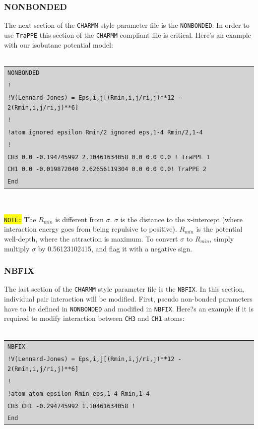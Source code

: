\subsubsection{NONBONDED}
The next section of the \texttt{CHARMM} style parameter file is the \texttt{NONBONDED}. In order to use \texttt{TraPPE} this section of the \texttt{CHARMM} compliant file is critical. Here's an example with our isobutane potential model:\\\\
\colorbox{lightgray}{
\begin{tabular}{l}
\texttt{NONBONDED }\\
\texttt{!}\\
\texttt{!V(Lennard-Jones) = Eps,i,j[(Rmin,i,j/ri,j)**12 - 2(Rmin,i,j/ri,j)**6]}\\
\texttt{!}\\
\texttt{!atom  ignored   epsilon     Rmin/2       ignored  eps,1-4  Rmin/2,1-4}\\
\texttt{!}\\
\texttt{CH3    0.0      -0.194745992  2.10461634058 0.0   0.0   0.0 ! TraPPE 1}\\
\texttt{CH1    0.0      -0.019872040  2.62656119304 0.0   0.0   0.0! TraPPE 2}\\
\texttt{End}\\
\end{tabular}}\\\\
\colorbox{yellow}{\texttt{NOTE:}} The \texttt{$R_{min}$} is different from \texttt{$\sigma$}. \texttt{$\sigma$} is the distance to the x-intercept (where interaction energy goes from being repulsive to positive). \texttt{$R_{min}$} is the potential well-depth, where the attraction is maximum. To convert \texttt{$\sigma$} to \texttt{$R_{min}$}, simply multiply \texttt{$\sigma$} by 0.56123102415, and flag it with a negative sign.\\

\subsubsection{NBFIX}
The last section of the \texttt{CHARMM} style parameter file is the \texttt{NBFIX}. In this section, individual pair interaction will be modified. First, pseudo non-bonded parameters have to be defined in \texttt{NONBONDED} and modified in \texttt{NBFIX}. Here?s an example if it is required to modify interaction between \texttt{CH3} and \texttt{CH1} atoms:\\\\
\colorbox{lightgray}{
\begin{tabular}{l}
\texttt{NBFIX }\\
\texttt{!V(Lennard-Jones) = Eps,i,j[(Rmin,i,j/ri,j)**12 - 2(Rmin,i,j/ri,j)**6]}\\
\texttt{!}\\
\texttt{!atom  atom  epsilon      Rmin  eps,1-4  Rmin,1-4}\\
\texttt{CH3   CH1    -0.294745992 1.10461634058 ! }\\
\texttt{End}\\
\end{tabular}}\\\\

